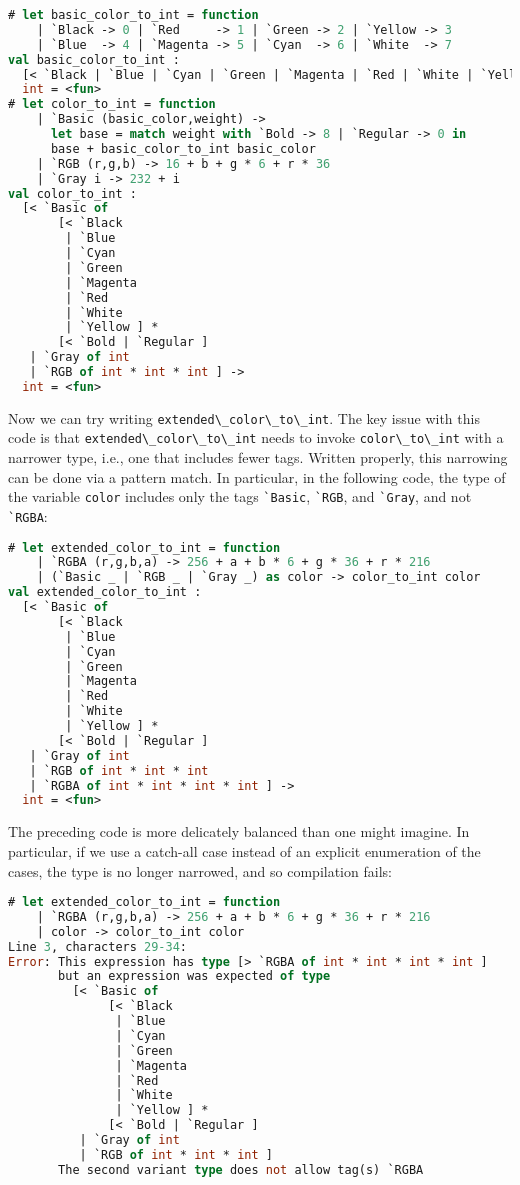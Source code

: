 \begin{lstlisting}[language=Caml]
# let basic_color_to_int = function
    | `Black -> 0 | `Red     -> 1 | `Green -> 2 | `Yellow -> 3
    | `Blue  -> 4 | `Magenta -> 5 | `Cyan  -> 6 | `White  -> 7
val basic_color_to_int :
  [< `Black | `Blue | `Cyan | `Green | `Magenta | `Red | `White | `Yellow ] ->
  int = <fun>
# let color_to_int = function
    | `Basic (basic_color,weight) ->
      let base = match weight with `Bold -> 8 | `Regular -> 0 in
      base + basic_color_to_int basic_color
    | `RGB (r,g,b) -> 16 + b + g * 6 + r * 36
    | `Gray i -> 232 + i
val color_to_int :
  [< `Basic of
       [< `Black
        | `Blue
        | `Cyan
        | `Green
        | `Magenta
        | `Red
        | `White
        | `Yellow ] *
       [< `Bold | `Regular ]
   | `Gray of int
   | `RGB of int * int * int ] ->
  int = <fun>
\end{lstlisting}

Now we can try writing
\passthrough{\lstinline!extended\_color\_to\_int!}. The key issue with
this code is that \passthrough{\lstinline!extended\_color\_to\_int!}
needs to invoke \passthrough{\lstinline!color\_to\_int!} with a narrower
type, i.e., one that includes fewer tags. Written properly, this
narrowing can be done via a pattern match. In particular, in the
following code, the type of the variable \passthrough{\lstinline!color!}
includes only the tags \passthrough{\lstinline!`Basic!},
\passthrough{\lstinline!`RGB!}, and \passthrough{\lstinline!`Gray!}, and
not \passthrough{\lstinline!`RGBA!}:

\begin{lstlisting}[language=Caml]
# let extended_color_to_int = function
    | `RGBA (r,g,b,a) -> 256 + a + b * 6 + g * 36 + r * 216
    | (`Basic _ | `RGB _ | `Gray _) as color -> color_to_int color
val extended_color_to_int :
  [< `Basic of
       [< `Black
        | `Blue
        | `Cyan
        | `Green
        | `Magenta
        | `Red
        | `White
        | `Yellow ] *
       [< `Bold | `Regular ]
   | `Gray of int
   | `RGB of int * int * int
   | `RGBA of int * int * int * int ] ->
  int = <fun>
\end{lstlisting}

The preceding code is more delicately balanced than one might imagine.
In particular, if we use a catch-all case instead of an explicit
enumeration of the cases, the type is no longer narrowed, and so
compilation fails:

\begin{lstlisting}[language=Caml]
# let extended_color_to_int = function
    | `RGBA (r,g,b,a) -> 256 + a + b * 6 + g * 36 + r * 216
    | color -> color_to_int color
Line 3, characters 29-34:
Error: This expression has type [> `RGBA of int * int * int * int ]
       but an expression was expected of type
         [< `Basic of
              [< `Black
               | `Blue
               | `Cyan
               | `Green
               | `Magenta
               | `Red
               | `White
               | `Yellow ] *
              [< `Bold | `Regular ]
          | `Gray of int
          | `RGB of int * int * int ]
       The second variant type does not allow tag(s) `RGBA
\end{lstlisting}

